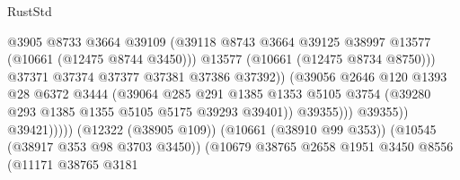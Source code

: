 \begin{lexlean}{RustStd}
\begin{coremodule}
                                                  @3905
                                                  @8733
                                                  @3664
                                                  @39109
                                                  (@39118
                                                    @8743
                                                    @3664
                                                    @39125
                                                    @38997
                                                    @13577
                                                    (@10661 (@12475 @8744 @3450)))
                                                  @13577
                                                  (@10661 (@12475 @8734 @8750)))
                                                @37371
                                                @37374
                                                @37377
                                                @37381
                                                @37386
                                                @37392))
                                            (@39056
                                              @2646
                                              @120
                                              @1393
                                              @28
                                              @6372
                                              @3444
                                              (@39064
                                                @285
                                                @291
                                                @1385
                                                @1353
                                                @5105
                                                @3754
                                                (@39280 @293 @1385 @1355 @5105 @5175 @39293 @39401))
                                              @39355)))
                                        @39355))
                                    @39421)))))
                          (@12322 (@38905 @109))
                          (@10661 (@38910 @99 @353))
                          (@10545 (@38917 @353 @98 @3703 @3450))
                          (@10679
                            @38765
                            @2658
                            @1951
                            @3450
                            @8556
                            (@11171
                              @38765
                              @3181

\end{coremodule}
\end{lexlean}
